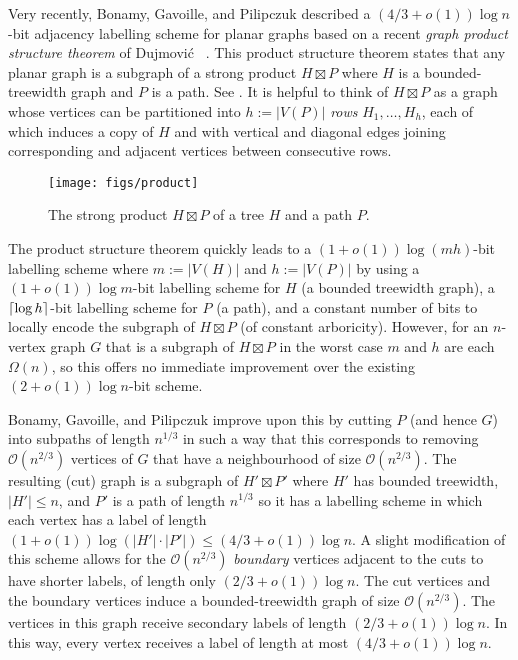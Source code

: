 \documentclass[kpfonts]{patmorin}
\newcommand{\Oh}{\mathcal{O}}
\let\le\leqslant
\begin{document}
Very recently, Bonamy, Gavoille, and Pilipczuk \cite{bonamy.gavoille.ea:shorter} described a $(4/3+o(1))\log n$-bit adjacency labelling scheme for planar graphs based on a recent \emph{graph product structure theorem} of Dujmović \etal\ \cite{dujmovic.joret.ea:planar}.  This product structure theorem states that any planar graph is a subgraph of a strong product $H\boxtimes P$ where $H$ is a bounded-treewidth graph and $P$ is a path. See . It is helpful to think of $H\boxtimes P$ as a graph whose vertices can be partitioned into $h:=|V(P)|$ \emph{rows} $H_1,\dots,H_{h}$, each of which induces a copy of $H$ and with vertical and diagonal edges joining corresponding and adjacent vertices between consecutive rows.

\begin{figure}[htbp]
  \begin{center}
    \texttt{[image: figs/product]}
  \end{center}
  \caption{The strong product $H\boxtimes P$ of a tree $H$ and a path $P$.}
\end{figure}

The product structure theorem quickly leads to a $(1+o(1))\log(mh)$-bit labelling scheme where $m:=|V(H)|$ and $h:=|V(P)|$ by using a $(1+o(1))\log m$-bit labelling scheme for $H$ (a bounded treewidth graph), a ${\lceil \log{h} \rceil}$-bit labelling scheme for $P$ (a path), and a constant number of bits to locally encode the subgraph of $H\boxtimes P$ (of constant arboricity).  However, for an $n$-vertex graph $G$ that is a subgraph of $H\boxtimes P$ in the worst case $m$ and $h$ are each $\Omega(n)$, so this offers no immediate improvement over the existing $(2+o(1))\log n$-bit scheme.

Bonamy, Gavoille, and Pilipczuk improve upon this by cutting $P$ (and hence $G$) into subpaths of length $n^{1/3}$ in such a way that this corresponds to removing $\Oh(n^{2/3})$ vertices of $G$ that have a neighbourhood of size $\Oh(n^{2/3})$. The resulting (cut) graph is a subgraph of $H'\boxtimes P'$ where $H'$ has bounded treewidth, $|H'|\le n$, and $P'$ is a path of length $n^{1/3}$ so it has a labelling scheme in which each vertex has a label of length $(1+o(1))\log (|H'|\cdot|P'|) \le (4/3+o(1))\log n$.  A slight modification of this scheme allows for the $\Oh(n^{2/3})$ \emph{boundary} vertices adjacent to the cuts to have shorter labels, of length only $(2/3+o(1))\log n$.  The cut vertices and the boundary vertices induce a bounded-treewidth graph of size $\Oh(n^{2/3})$.  The vertices in this graph receive secondary labels of length $(2/3+o(1))\log n$.  In this way, every vertex receives a label of length at most $(4/3 + o(1))\log n$.
\end{document}

